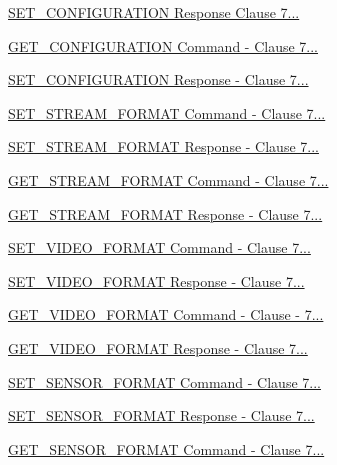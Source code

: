 \begin{DoxyCompactItemize}
\item 
\hyperlink{group__command__set__configuration__response}{S\+E\+T\+\_\+\+C\+O\+N\+F\+I\+G\+U\+R\+A\+T\+I\+O\+N Response Clause 7...}
\item 
\hyperlink{group__command__get__configuration}{G\+E\+T\+\_\+\+C\+O\+N\+F\+I\+G\+U\+R\+A\+T\+I\+O\+N Command -\/ Clause 7...}
\item 
\hyperlink{group__command__get__configuration__response}{S\+E\+T\+\_\+\+C\+O\+N\+F\+I\+G\+U\+R\+A\+T\+I\+O\+N Response -\/ Clause 7...}
\item 
\hyperlink{group__command__set__stream__format}{S\+E\+T\+\_\+\+S\+T\+R\+E\+A\+M\+\_\+\+F\+O\+R\+M\+A\+T Command -\/ Clause 7...}
\item 
\hyperlink{group__command__set__stream__format__response}{S\+E\+T\+\_\+\+S\+T\+R\+E\+A\+M\+\_\+\+F\+O\+R\+M\+A\+T Response -\/ Clause 7...}
\item 
\hyperlink{group__command__get__stream__format}{G\+E\+T\+\_\+\+S\+T\+R\+E\+A\+M\+\_\+\+F\+O\+R\+M\+A\+T Command -\/ Clause 7...}
\item 
\hyperlink{group__command__get__stream__format__response}{G\+E\+T\+\_\+\+S\+T\+R\+E\+A\+M\+\_\+\+F\+O\+R\+M\+A\+T Response -\/ Clause 7...}
\item 
\hyperlink{group__command__set__video__format}{S\+E\+T\+\_\+\+V\+I\+D\+E\+O\+\_\+\+F\+O\+R\+M\+A\+T Command -\/ Clause 7...}
\item 
\hyperlink{group__command__set__video__format__response}{S\+E\+T\+\_\+\+V\+I\+D\+E\+O\+\_\+\+F\+O\+R\+M\+A\+T Response -\/ Clause 7...}
\item 
\hyperlink{group__command__get__video__format}{G\+E\+T\+\_\+\+V\+I\+D\+E\+O\+\_\+\+F\+O\+R\+M\+A\+T Command -\/ Clause -\/ 7...}
\item 
\hyperlink{group__command__get__video__format__response}{G\+E\+T\+\_\+\+V\+I\+D\+E\+O\+\_\+\+F\+O\+R\+M\+A\+T Response -\/ Clause 7...}
\item 
\hyperlink{group__command__set__sensor__format}{S\+E\+T\+\_\+\+S\+E\+N\+S\+O\+R\+\_\+\+F\+O\+R\+M\+A\+T Command -\/ Clause 7...}
\item 
\hyperlink{group__command__set__sensor__format__response}{S\+E\+T\+\_\+\+S\+E\+N\+S\+O\+R\+\_\+\+F\+O\+R\+M\+A\+T Response -\/ Clause 7...}
\item 
\hyperlink{group__command__get__sensor__format}{G\+E\+T\+\_\+\+S\+E\+N\+S\+O\+R\+\_\+\+F\+O\+R\+M\+A\+T Command -\/ Clause 7...}

\end{DoxyCompactItemize}
